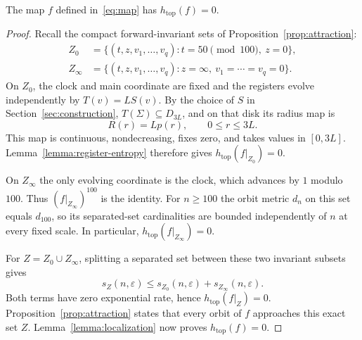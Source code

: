 \begin{proposition}\label{prop:zero-entropy}
The map $f$ defined in~\eqref{eq:map} has
$h_{\mathrm{top}}(f)=0$.
\end{proposition}

\begin{proof}
Recall the compact forward-invariant sets of
Proposition~\ref{prop:attraction}:
\[
  \begin{aligned}
    Z_0&=\{(t,z,v_1,\ldots,v_q):t=50\pmod{100},\ z=0\},\\
    Z_\infty&=\{(t,z,v_1,\ldots,v_q):z=\infty,\ v_1=\cdots=v_q=0\}.
  \end{aligned}
\]
On $Z_0$, the clock and main coordinate are fixed and the registers
evolve independently by $T(v)=LS(v)$.  By the choice of $S$ in
Section~\ref{sec:construction}, $T(\Sigma)\subseteq D_{3L}$, and on
that disk its radius map is
\[
  R(r)=Lp(r),\qquad 0\leq r\leq 3L.
\]
This map is continuous, nondecreasing, fixes zero, and takes values
in $[0,3L]$.  Lemma~\ref{lemma:register-entropy} therefore gives
$h_{\mathrm{top}}(f|_{Z_0})=0$.

On $Z_\infty$ the only evolving coordinate is the clock, which
advances by $1$ modulo $100$.  Thus $(f|_{Z_\infty})^{100}$ is the
identity.  For $n\geq100$ the orbit metric $d_n$ on this set equals
$d_{100}$, so its separated-set cardinalities are bounded
independently of $n$ at every fixed scale.  In particular,
$h_{\mathrm{top}}(f|_{Z_\infty})=0$.

For $Z=Z_0\cup Z_\infty$, splitting a separated set between these
two invariant subsets gives
\[
  s_Z(n,\varepsilon)\leq
  s_{Z_0}(n,\varepsilon)+s_{Z_\infty}(n,\varepsilon).
\]
Both terms have zero exponential rate, hence
$h_{\mathrm{top}}(f|_Z)=0$.  Proposition~\ref{prop:attraction}
states that every orbit of $f$ approaches this exact set $Z$.
Lemma~\ref{lemma:localization} now proves
$h_{\mathrm{top}}(f)=0$.
\end{proof}
